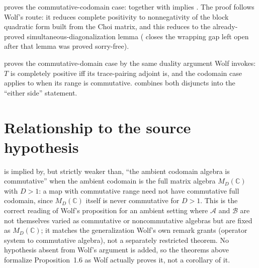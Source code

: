 \documentclass{article}
\begin{document}
proves the commutative-codomain case:
 together with  implies
. The proof follows Wolf's route: it reduces complete
positivity to nonnegativity of the block quadratic form built from the Choi
matrix, and this reduces to the already-proved simultaneous-diagonalization
lemma 
 ( closes the wrapping gap left open
after that lemma was proved sorry-free).

proves the commutative-domain case by the same duality argument Wolf invokes:
$T$ is completely positive iff its trace-pairing adjoint
 is, and the codomain case applies to
 when its range is commutative.
combines both disjuncts into the ``either side'' statement.

\section{Relationship to the source hypothesis}

 is implied by, but strictly weaker than, ``the
ambient codomain algebra is commutative'' when the ambient codomain is the
full matrix algebra $M_D(\mathbb C)$ with $D>1$: a map with commutative range
need not have commutative full codomain, since $M_D(\mathbb C)$ itself is
never commutative for $D>1$. This is the correct reading of Wolf's
proposition for an ambient setting where $\mathcal A$ and $\mathcal B$ are
not themselves varied as commutative or noncommutative algebras but are
fixed as $M_D(\mathbb C)$; it matches the generalization Wolf's own remark
grants (operator system to commutative algebra), not a separately restricted
theorem. No hypothesis absent from Wolf's argument is added, so the theorems
above formalize Proposition~1.6 as Wolf actually proves it, not a
corollary of it.



\end{document}

